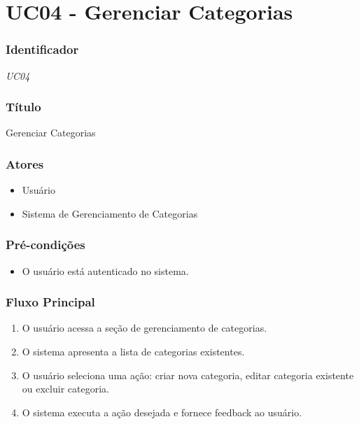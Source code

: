 \chapter{UC04 - Gerenciar Categorias}
\label{apendiceUC04}

\subsection*{Identificador}
\textit{UC04}

\subsection*{Título}
Gerenciar Categorias

\subsection*{Atores}
\begin{addmargin}[1.5cm]{0cm}
	\begin{itemize}
		\item Usuário
		\item Sistema de Gerenciamento de Categorias
	\end{itemize}
\end{addmargin}

\subsection*{Pré-condições}
\begin{addmargin}[1.5cm]{0cm}
	\begin{itemize}
		\item O usuário está autenticado no sistema.
	\end{itemize}
\end{addmargin}

\subsection*{Fluxo Principal}
\begin{addmargin}[1.5cm]{0cm}
	\begin{enumerate}
		\item O usuário acessa a seção de gerenciamento de categorias.
		\item O sistema apresenta a lista de categorias existentes.
		\item O usuário seleciona uma ação: criar nova categoria, editar categoria existente ou excluir categoria.
		\item O sistema executa a ação desejada e fornece feedback ao usuário.
	\end{enumerate}
\end{addmargin}

